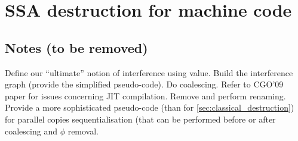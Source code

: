 \chapter{SSA destruction for machine code }
\graphicspath{{figs/}{part1/alternative_ssa_destruction_algorithm/figs/}{../part1/alternative_ssa_destruction_algorithm/figs/}}
\label{chap:alternative_ssa_destruction_algorithm}








\section{Notes (to be removed)}

Define our ``ultimate'' notion of interference using value. Build the interference graph (provide the simplified pseudo-code). Do coalescing. Refer to CGO'09 paper for issues concerning JIT compilation. Remove \phifuns and perform renaming. Provide a more sophisticated pseudo-code (than for \ref{sec:classical_destruction}) for parallel copies sequentialisation (that can be performed before or after coalescing and $\phi$ removal.





